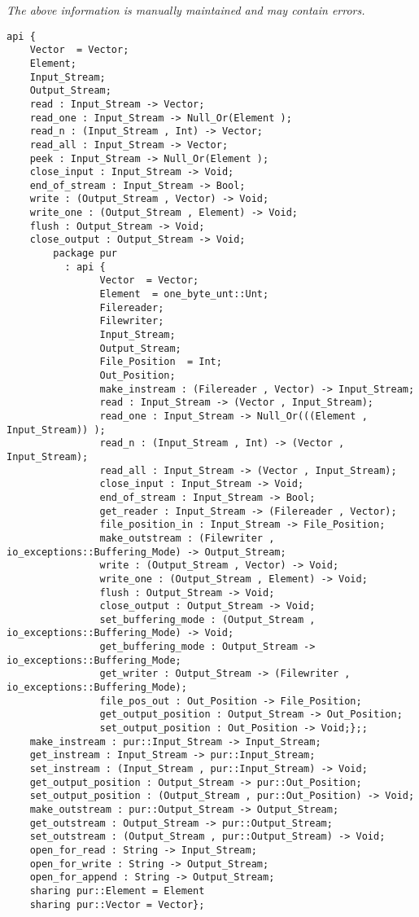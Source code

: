 \label{api:Winix\_Data\_File\_For\_Os\_\_Premicrothread}

{\tiny \it The above information is manually maintained and may contain errors.}
\begin{verbatim}
api {
    Vector  = Vector;
    Element;
    Input_Stream;
    Output_Stream;
    read : Input_Stream -> Vector;
    read_one : Input_Stream -> Null_Or(Element );
    read_n : (Input_Stream , Int) -> Vector;
    read_all : Input_Stream -> Vector;
    peek : Input_Stream -> Null_Or(Element );
    close_input : Input_Stream -> Void;
    end_of_stream : Input_Stream -> Bool;
    write : (Output_Stream , Vector) -> Void;
    write_one : (Output_Stream , Element) -> Void;
    flush : Output_Stream -> Void;
    close_output : Output_Stream -> Void;
        package pur
          : api {
                Vector  = Vector;
                Element  = one_byte_unt::Unt;
                Filereader;
                Filewriter;
                Input_Stream;
                Output_Stream;
                File_Position  = Int;
                Out_Position;
                make_instream : (Filereader , Vector) -> Input_Stream;
                read : Input_Stream -> (Vector , Input_Stream);
                read_one : Input_Stream -> Null_Or(((Element , Input_Stream)) );
                read_n : (Input_Stream , Int) -> (Vector , Input_Stream);
                read_all : Input_Stream -> (Vector , Input_Stream);
                close_input : Input_Stream -> Void;
                end_of_stream : Input_Stream -> Bool;
                get_reader : Input_Stream -> (Filereader , Vector);
                file_position_in : Input_Stream -> File_Position;
                make_outstream : (Filewriter , io_exceptions::Buffering_Mode) -> Output_Stream;
                write : (Output_Stream , Vector) -> Void;
                write_one : (Output_Stream , Element) -> Void;
                flush : Output_Stream -> Void;
                close_output : Output_Stream -> Void;
                set_buffering_mode : (Output_Stream , io_exceptions::Buffering_Mode) -> Void;
                get_buffering_mode : Output_Stream -> io_exceptions::Buffering_Mode;
                get_writer : Output_Stream -> (Filewriter , io_exceptions::Buffering_Mode);
                file_pos_out : Out_Position -> File_Position;
                get_output_position : Output_Stream -> Out_Position;
                set_output_position : Out_Position -> Void;};;
    make_instream : pur::Input_Stream -> Input_Stream;
    get_instream : Input_Stream -> pur::Input_Stream;
    set_instream : (Input_Stream , pur::Input_Stream) -> Void;
    get_output_position : Output_Stream -> pur::Out_Position;
    set_output_position : (Output_Stream , pur::Out_Position) -> Void;
    make_outstream : pur::Output_Stream -> Output_Stream;
    get_outstream : Output_Stream -> pur::Output_Stream;
    set_outstream : (Output_Stream , pur::Output_Stream) -> Void;
    open_for_read : String -> Input_Stream;
    open_for_write : String -> Output_Stream;
    open_for_append : String -> Output_Stream;
    sharing pur::Element = Element
    sharing pur::Vector = Vector};
\end{verbatim}
